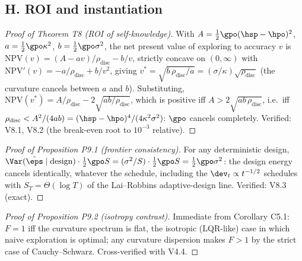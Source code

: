 \subsection*{H. ROI and instantiation}

\begin{proof}[Proof of Theorem T8 (ROI of self-knowledge)]
With $A = \tfrac{1}{2}\gpo(\hsp - \hpo)^2$, $a = \tfrac{1}{2}\gpo\kappa^2$,
$b = \tfrac{1}{2}\gpo\sigma^2$, the net present value of exploring to
accuracy $v$ is $\mathrm{NPV}(v) = (A - a v)/\rho_{\mathrm{disc}} - b/v$,
strictly concave on $(0,\infty)$ with
$\mathrm{NPV}'(v) = -a/\rho_{\mathrm{disc}} + b/v^2$, giving
$v^* = \sqrt{b\,\rho_{\mathrm{disc}}/a} =
(\sigma/\kappa)\sqrt{\rho_{\mathrm{disc}}}$ (the curvature cancels between
$a$ and $b$). Substituting, $\mathrm{NPV}(v^*) = A/\rho_{\mathrm{disc}} -
2\sqrt{ab/\rho_{\mathrm{disc}}}$, which is positive iff
$A > 2\sqrt{a b\,\rho_{\mathrm{disc}}}$, i.e.\ iff
$\rho_{\mathrm{disc}} < A^2/(4ab) = (\hsp - \hpo)^4/(4\kappa^2\sigma^2)$:
$\gpo$ cancels completely. Verified: V8.1, V8.2 (the break-even root to
$10^{-3}$ relative).
\end{proof}

\begin{proof}[Proof of Proposition P9.1 (frontier consistency)]
For any deterministic design, $\Var(\hat\eps\mid\mathrm{design}) \cdot
\tfrac{1}{2}\gpo S = (\sigma^2/S)\cdot\tfrac{1}{2}\gpo S =
\tfrac{1}{2}\gpo\sigma^2$: the design energy cancels identically, whatever
the schedule, including the $\dev_t \propto t^{-1/2}$ schedules with
$S_T = \Theta(\log T)$ of the Lai--Robbins adaptive-design line. Verified:
V8.3 (exact).
\end{proof}

\begin{proof}[Proof of Proposition P9.2 (isotropy contrast)]
Immediate from Corollary C5.1: $F = 1$ iff the curvature spectrum is flat,
the isotropic (LQR-like) case in which naive exploration is optimal;
any curvature dispersion makes $F > 1$ by the strict case of
Cauchy--Schwarz. Cross-verified with V4.4.
\end{proof}

